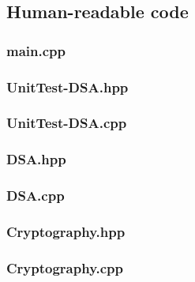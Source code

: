 \documentclass{article}
\begin{document}
    \newpage

    \lstset{style=myStyle}
    
    \subsection*{Human-readable code}
    \subsubsection*{main.cpp}
    
    \subsubsection*{UnitTest-DSA.hpp}
    
    
    \subsubsection*{UnitTest-DSA.cpp}
    

    \subsubsection*{DSA.hpp}
    

    \subsubsection*{DSA.cpp}
    

    \subsubsection*{Cryptography.hpp}
    

    \subsubsection*{Cryptography.cpp}
    
\end{document}

